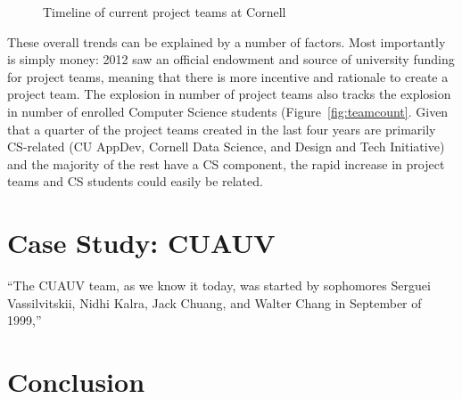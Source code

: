 \documentclass[12pt]{article}
\begin{document}
\begin{landscape}
  \begin{figure}
    
    \caption{Timeline of current project teams at Cornell}
    \label{fig:timeline}
  \end{figure}
\end{landscape}

These overall trends can be explained by a number of factors.
Most importantly is simply money: 2012 saw an official endowment and source of university funding for project teams, meaning that there is more incentive and rationale to create a project team.
The explosion in number of project teams also tracks the explosion in number of enrolled Computer Science students (Figure~\ref{fig:teamcount}.
Given that a quarter of the project teams created in the last four years are primarily CS-related (CU AppDev, Cornell Data Science, and Design and Tech Initiative) and the majority of the rest have a CS component, the rapid increase in project teams and CS students could easily be related.


\section{Case Study: CUAUV}
\label{sec:cuauv}

``The CUAUV team, as we know it today, was started by sophomores Serguei Vassilvitskii, Nidhi Kalra, Jack Chuang, and Walter Chang in September of 1999,''
\cite{noauthor_cuauv_2003}



\section{Conclusion}
\label{sec:conclusion}




\end{document}
